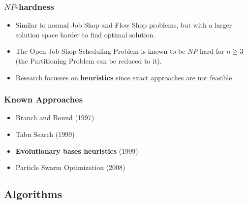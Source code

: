 \begin{frame}
	\frametitle{$NP$-hardness}
	
	\begin{itemize}
	
		\item Similar to normal Job Shop and Flow Shop problems, but with a larger solution space \textrightarrow harder to find optimal solution.

		\item 	The Open Job Shop Scheduling Problem is known to be $NP$-hard for $n \geq 3$ (the Partitioning Problem can be reduced to it).

		\item 	\textrightarrow Research focusses on \textbf{heuristics} since exact approaches are not feasible.
	\end{itemize}
	
	
\end{frame}


\begin{frame}
	\frametitle{Known Approaches}
	\begin{itemize}
	
		\item Branch and Bound (1997)

		\item 	Tabu Search (1999)

		\item 	\textbf{Evolutionary bases heuristics} (1999)

		\item 	Particle Swarm Optimization (2008)
	\end{itemize}
	
	
\end{frame}


\subsection{Algorithms}


